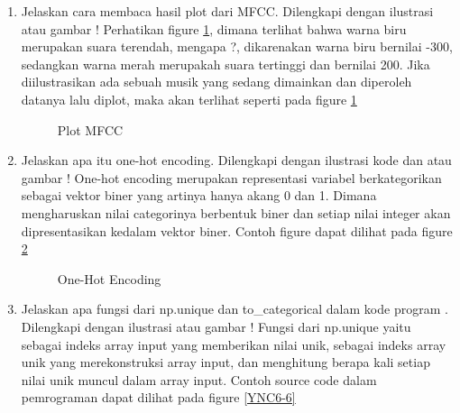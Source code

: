 \begin{enumerate}
\item Jelaskan cara membaca hasil plot dari MFCC. Dilengkapi dengan ilustrasi atau gambar !
	\subitem Perhatikan figure \ref{YNC6-4}, dimana terlihat bahwa warna biru merupakan suara terendah, mengapa ?, dikarenakan warna biru bernilai -300, sedangkan warna merah merupakah suara tertinggi dan bernilai 200. Jika diilustrasikan ada sebuah musik yang sedang dimainkan dan diperoleh datanya lalu diplot, maka akan terlihat seperti pada figure \ref{YNC6-4}

	\begin{figure}[!htbp]
		\caption{Plot MFCC}
		\label{YNC6-4}
	\end{figure}	

\item Jelaskan apa itu one-hot encoding. Dilengkapi dengan ilustrasi kode dan atau gambar !
	\subitem One-hot encoding merupakan representasi variabel berkategorikan sebagai vektor biner yang artinya hanya akang 0 dan 1. Dimana mengharuskan nilai categorinya berbentuk biner dan setiap nilai integer akan dipresentasikan kedalam vektor biner. Contoh figure dapat dilihat pada figure \ref{YNC6-5}

	\begin{figure}[!htbp]
		\caption{One-Hot Encoding}
		\label{YNC6-5}
	\end{figure}	

\item Jelaskan apa fungsi dari np.unique dan to\_categorical dalam kode program . Dilengkapi dengan ilustrasi atau gambar !
	\subitem Fungsi dari np.unique yaitu sebagai indeks array input yang memberikan nilai unik, sebagai indeks array unik yang merekonstruksi array input, dan menghitung berapa kali setiap nilai unik muncul dalam array input. Contoh source code dalam pemrograman dapat dilihat pada figure \ref{YNC6-6}


\end{enumerate}
